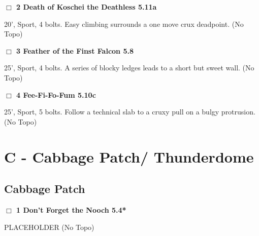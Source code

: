 \begin{multicols}{2}
\needspace{1.5cm}
\label{rt:Death of Koschei the Deathless}
\colorbox{RoyalBlue!20}{
\parbox{0.95\linewidth}{
\hspace{-1ex}\textbf{$\Box$
2 Death of Koschei the Deathless 5.11a  
}}}
\begin{adjustwidth}{1.3em}{}			
20', Sport, 4 bolts. Easy climbing surrounds a one move crux deadpoint.
  (No Topo)
\end{adjustwidth}




\needspace{1.5cm}
\label{rt:Feather of the Finst Falcon}
\colorbox{green!20}{
\parbox{0.95\linewidth}{
\hspace{-1ex}\textbf{$\Box$
3 Feather of the Finst Falcon 5.8  
}}}
\begin{adjustwidth}{1.3em}{}			
25', Sport, 4 bolts. A series of blocky ledges leads to a short but sweet wall.
  (No Topo)
\end{adjustwidth}




\needspace{1.5cm}
\label{rt:Fee-Fi-Fo-Fum}
\colorbox{RoyalBlue!20}{
\parbox{0.95\linewidth}{
\hspace{-1ex}\textbf{$\Box$
4 Fee-Fi-Fo-Fum 5.10c  
}}}
\begin{adjustwidth}{1.3em}{}			
25', Sport, 5 bolts. Follow a technical slab to a cruxy pull on a bulgy protrusion.
  (No Topo)
\end{adjustwidth}





\newpage

\section{C - Cabbage Patch/ Thunderdome}\label{sa:Cabbage Patch/ Thunderdome}




\needspace{1.5cm}
\subsection*{Cabbage Patch}\label{bf:Cabbage Patch}
	


\needspace{1.5cm}
\label{rt:Don't Forget the Nooch}
\colorbox{green!20}{
\parbox{0.95\linewidth}{
\hspace{-1ex}\textbf{$\Box$
1 Don't Forget the Nooch 5.4*  
}}}
\begin{adjustwidth}{1.3em}{}			
PLACEHOLDER
  (No Topo)
\end{adjustwidth}





\end{multicols}
